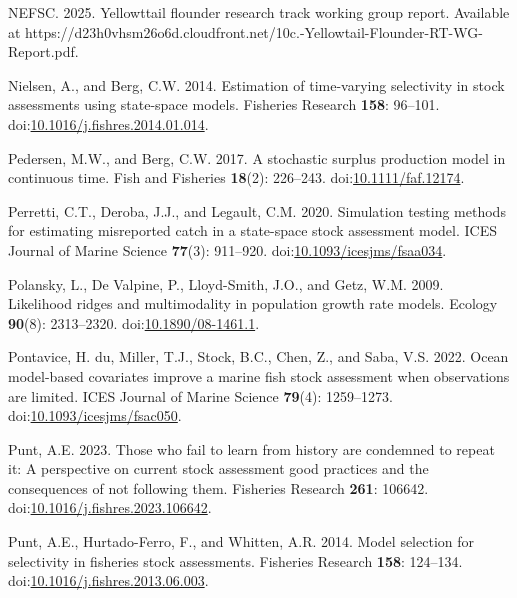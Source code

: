 \documentclass[
  12pt,
]{article}
\newlength{\cslhangindent}
\newlength{\cslentryspacingunit} %
\newenvironment{CSLReferences}[2] %
 {%
  \setlength{\parindent}{0pt}
  \ifodd #1
  \let\oldpar\par
  \def\par{\hangindent=\cslhangindent\oldpar}
  \fi
  \setlength{\parskip}{#2\cslentryspacingunit}
 }%
 {}
\begin{document}
\begin{CSLReferences}{1}{0}
\leavevmode{}%
NEFSC. 2025. Yellowttail flounder research track working group report.
{Available} at
https://d23h0vhsm26o6d.cloudfront.net/10c.-Yellowtail-Flounder-RT-WG-Report.pdf.

\leavevmode{}%
Nielsen, A., and Berg, C.W. 2014. Estimation of time-varying selectivity
in stock assessments using state-space models. Fisheries Research
\textbf{158}: 96--101.
doi:\href{https://doi.org/10.1016/j.fishres.2014.01.014}{10.1016/j.fishres.2014.01.014}.

\leavevmode{}%
Pedersen, M.W., and Berg, C.W. 2017. A stochastic surplus production
model in continuous time. Fish and Fisheries \textbf{18}(2): 226--243.
doi:\href{https://doi.org/10.1111/faf.12174}{10.1111/faf.12174}.

\leavevmode{}%
Perretti, C.T., Deroba, J.J., and Legault, C.M. 2020. Simulation testing
methods for estimating misreported catch in a state-space stock
assessment model. ICES Journal of Marine Science \textbf{77}(3):
911--920.
doi:\href{https://doi.org/10.1093/icesjms/fsaa034}{10.1093/icesjms/fsaa034}.

\leavevmode{}%
Polansky, L., De Valpine, P., Lloyd-Smith, J.O., and Getz, W.M. 2009.
Likelihood ridges and multimodality in population growth rate models.
Ecology \textbf{90}(8): 2313--2320.
doi:\href{https://doi.org/10.1890/08-1461.1}{10.1890/08-1461.1}.

\leavevmode{}%
Pontavice, H. du, Miller, T.J., Stock, B.C., Chen, Z., and Saba, V.S.
2022. Ocean model-based covariates improve a marine fish stock
assessment when observations are limited. ICES Journal of Marine Science
\textbf{79}(4): 1259--1273.
doi:\href{https://doi.org/10.1093/icesjms/fsac050}{10.1093/icesjms/fsac050}.

\leavevmode{}%
Punt, A.E. 2023. Those who fail to learn from history are condemned to
repeat it: A perspective on current stock assessment good practices and
the consequences of not following them. Fisheries Research \textbf{261}:
106642.
doi:\href{https://doi.org/10.1016/j.fishres.2023.106642}{10.1016/j.fishres.2023.106642}.

\leavevmode{}%
Punt, A.E., Hurtado-Ferro, F., and Whitten, A.R. 2014. Model selection
for selectivity in fisheries stock assessments. Fisheries Research
\textbf{158}: 124--134.
doi:\href{https://doi.org/10.1016/j.fishres.2013.06.003}{10.1016/j.fishres.2013.06.003}.


\end{CSLReferences}
\end{document}
